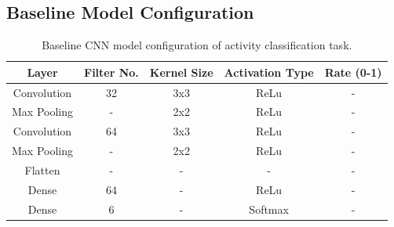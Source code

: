 \documentclass{l4proj}
\begin{document}
\begin{appendices}
\subsection{Baseline Model Configuration}
\begin{table}[h]
    \centering
    \begin{tabular}{ccccc}
        \toprule
        \textbf{Layer} & \textbf{Filter No.} & \textbf{Kernel Size} & \textbf{Activation Type} & \textbf{Rate (0-1)} \\
        \midrule
        \midrule
        Convolution & 32  & 3x3 & ReLu & - \\
        Max Pooling & - & 2x2 & ReLu & - \\
        Convolution & 64 & 3x3 & ReLu & - \\
        Max Pooling & - & 2x2 & ReLu & - \\
        Flatten & - & - & - & - \\
        Dense & 64 & - & ReLu & - \\
        Dense & 6 & - & Softmax  & - \\
        \bottomrule
    \end{tabular}
    \caption{Baseline CNN model configuration of activity classification task.}
    \label{tab:activity-initial-CNN-configuration}
\end{table}


\end{appendices}
\end{document}
